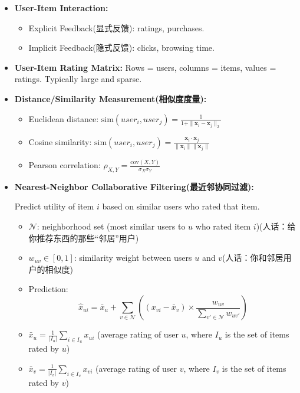 \documentclass[UTF8]{ctexart}
\begin{document}
\begin{itemize}
    \item \textbf{User-Item Interaction:}
    \begin{itemize}
        \item Explicit Feedback(显式反馈): ratings, purchases.
        \item Implicit Feedback(隐式反馈): clicks, browsing time.
    \end{itemize}
    \item \textbf{User-Item Rating Matrix:} Rows = users, columns = items, values = ratings. Typically large and sparse.
    \item \textbf{Distance/Similarity Measurement(相似度度量):}
    \begin{itemize}
        \item Euclidean distance: $\text{sim}(user_i, user_j) = \frac{1}{1 + \|\mathbf{x}_i - \mathbf{x}_j\|_2}$
        \item Cosine similarity: $\text{sim}(user_i, user_j) = \frac{\mathbf{x}_i \cdot \mathbf{x}_j}{\|\mathbf{x}_i\| \|\mathbf{x}_j\|}$
        \item Pearson correlation: $\rho_{X,Y} = \frac{\text{cov}(X, Y)}{\sigma_X \sigma_Y}$
    \end{itemize}

    \item \textbf{Nearest-Neighbor Collaborative Filtering(最近邻协同过滤):}
    
    Predict utility of item $i$ based on similar users who rated that item.
    \begin{itemize}
        \item $\mathcal{N}$: neighborhood set (most similar users to $u$ who rated item $i$)(人话：给你推荐东西的那些“邻居”用户)
        \item $w_{uv} \in [0,1]$: similarity weight between users $u$ and $v$(人话：你和邻居用户的相似度)
        \item Prediction:
        \[\hat{x}_{ui} = \bar{x}_u + \sum_{v \in \mathcal{N}} \left( (x_{vi} - \bar{x}_v) \times \frac{w_{uv}}{\sum_{v' \in \mathcal{N}} w_{uv'}} \right)\]
        \item $\bar{x}_u = \frac{1}{|I_u|} \sum_{i \in I_u} x_{ui}$ (average rating of user $u$, where $I_u$ is the set of items rated by $u$)
        \item $\bar{x}_v = \frac{1}{|I_v|} \sum_{i \in I_v} x_{vi}$ (average rating of user $v$, where $I_v$ is the set of items rated by $v$)
    \end{itemize}


\end{itemize}
\end{document}
